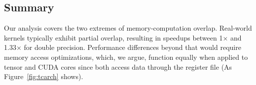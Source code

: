 
\subsection{Summary}


Our analysis covers the two extremes of memory-computation overlap. Real-world kernels typically exhibit partial overlap, resulting in speedups between 1× and 1.33× for double precision. Performance differences beyond that would require memory access optimizations, which, we argue, function equally when applied to tensor and CUDA cores since both access data through the register file (As Figure~\ref{fig:tcarch} shows).



